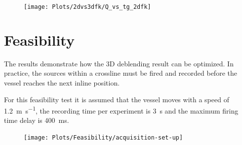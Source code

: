 \begin{figure}
	\centering
	\texttt{[image: Plots/2dvs3dfk/Q\_vs\_tg\_2dfk]}
	\caption{}
	\label{fig:Ch-Results-QualityFactors_2d}
\end{figure}


\section{Feasibility}

The results demonstrate how the 3D deblending result can be optimized. In practice, the sources within a crossline must be fired and recorded before the vessel reaches the next inline position.

For this feasibility test it is assumed that the vessel moves with a speed of \SI{1.2}{\metre\per\second}, the recording time per experiment is \SI{3}{\second} and the maximum firing time delay is \SI{400}{\milli\second}. 

\begin{figure}
	\centering
	\texttt{[image: Plots/Feasibility/acquisition-set-up]}
	\caption{}
	\label{fig:Ch-Results-Feasibility-Set-Up}
\end{figure}







